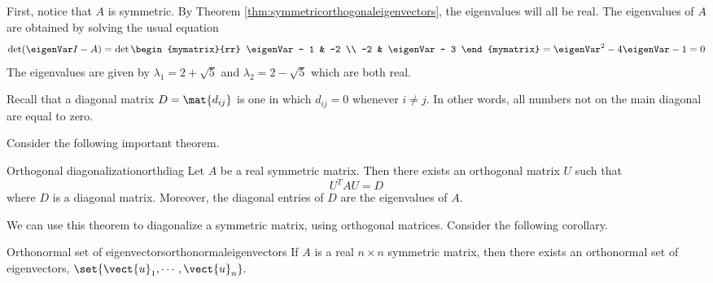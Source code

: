\begin{solution}
First, notice that $A$ is symmetric. By Theorem \ref{thm:symmetricorthogonaleigenvectors}, the eigenvalues will all be real. The eigenvalues of $A$ are obtained by solving the usual equation 
\[
\det (\eigenVar I - A) = 
\det \begin{mymatrix}{rr}
\eigenVar - 1 & -2 \\ 
-2 & \eigenVar - 3 
\end{mymatrix} = \eigenVar^2 -4\eigenVar -1=0
\]
The eigenvalues are given by $\lambda_1 =2+
\sqrt{5}$ and $\lambda_2 =2-\sqrt{5}$ which are both real. 
\end{solution}

Recall that a diagonal matrix $D=\mat{d_{ij} }$ is one in which $d_{ij} = 0$ whenever $i \neq j$. In other words, all numbers not on the main diagonal are equal to zero. 

Consider the following important theorem.

\begin{theorem}{Orthogonal diagonalization}{orthdiag}
Let $A$ be a real symmetric matrix. Then there exists an
orthogonal matrix $U$ such that 
\[
U^{T}AU = D
\]
where $D$ is a diagonal matrix. Moreover,
the diagonal entries of $D$ are the eigenvalues of $A$.
\end{theorem}

We can use this theorem to diagonalize a symmetric matrix, using orthogonal matrices. Consider the following corollary.

\begin{corollary}{Orthonormal set of eigenvectors}{orthonormaleigenvectors}
If $A$ is a real $n\times n$ symmetric matrix, then there exists an
orthonormal set of eigenvectors, $\set{\vect{u}_{1},\cdots ,\vect{u}
_{n}} .$
\end{corollary}

